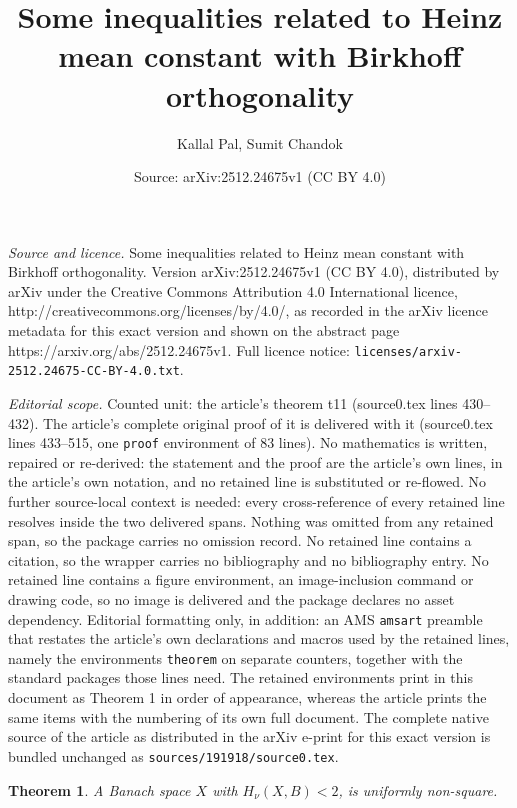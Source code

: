 \documentclass[10pt,a4paper]{amsart}
\title{Some inequalities related to Heinz mean constant with Birkhoff orthogonality}
\author{Kallal Pal, Sumit Chandok}
\date{Source: arXiv:2512.24675v1 (CC BY 4.0)}
\newtheorem{theorem}{Theorem}
\begin{document}
\maketitle

\noindent\emph{Source and licence.} Some inequalities related to Heinz mean constant with Birkhoff orthogonality. Version arXiv:2512.24675v1 (CC BY 4.0), distributed by arXiv under the Creative Commons Attribution 4.0 International licence, http://creativecommons.org/licenses/by/4.0/, as recorded in the arXiv licence metadata for this exact version and shown on the abstract page https://arxiv.org/abs/2512.24675v1. Full licence notice: \texttt{licenses/arxiv-2512.24675-CC-BY-4.0.txt}.\par\smallskip

\noindent\textit{Editorial scope.} Counted unit: the article's theorem t11 (source0.tex lines 430--432). The article's complete original proof of it is delivered with it (source0.tex lines 433--515, one \texttt{proof} environment of 83 lines). No mathematics is written, repaired or re-derived: the statement and the proof are the article's own lines, in the article's own notation, and no retained line is substituted or re-flowed.  No further source-local context is needed: every cross-reference of every retained line resolves inside the two delivered spans.  Nothing was omitted from any retained span, so the package carries no omission record.  No retained line contains a citation, so the wrapper carries no bibliography and no bibliography entry.  No retained line contains a figure environment, an image-inclusion command or drawing code, so no image is delivered and the package declares no asset dependency.  Editorial formatting only, in addition: an AMS \texttt{amsart} preamble that restates the article's own declarations and macros used by the retained lines, namely the environments \texttt{theorem} on separate counters, together with the standard packages those lines need.  The retained environments print in this document as Theorem 1 in order of appearance, whereas the article prints the same items with the numbering of its own full document.  The complete native source of the article as distributed in the arXiv e-print for this exact version is bundled unchanged as \texttt{sources/191918/source0.tex}.
\begin{theorem}\label{t11}
A Banach space $X$ with $H_\nu(X,B)< 2$,  is uniformly non-square.
\end{theorem}
\end{document}
